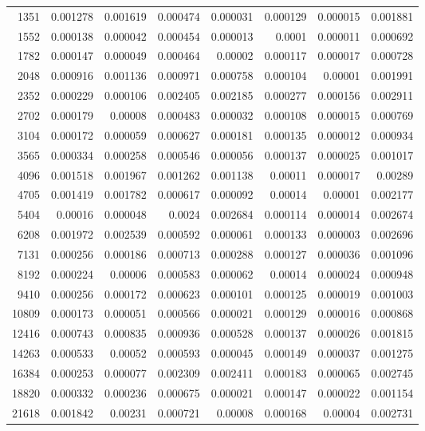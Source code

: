\begin{tabular}{r r r r r r r r}
1351 & 0.001278 & 0.001619 & 0.000474 & 0.000031 & 0.000129 & 0.000015 & 0.001881 \\
1552 & 0.000138 & 0.000042 & 0.000454 & 0.000013 & 0.0001 & 0.000011 & 0.000692 \\
1782 & 0.000147 & 0.000049 & 0.000464 & 0.00002 & 0.000117 & 0.000017 & 0.000728 \\
2048 & 0.000916 & 0.001136 & 0.000971 & 0.000758 & 0.000104 & 0.00001 & 0.001991 \\
2352 & 0.000229 & 0.000106 & 0.002405 & 0.002185 & 0.000277 & 0.000156 & 0.002911 \\
2702 & 0.000179 & 0.00008 & 0.000483 & 0.000032 & 0.000108 & 0.000015 & 0.000769 \\
3104 & 0.000172 & 0.000059 & 0.000627 & 0.000181 & 0.000135 & 0.000012 & 0.000934 \\
3565 & 0.000334 & 0.000258 & 0.000546 & 0.000056 & 0.000137 & 0.000025 & 0.001017 \\
4096 & 0.001518 & 0.001967 & 0.001262 & 0.001138 & 0.00011 & 0.000017 & 0.00289 \\
4705 & 0.001419 & 0.001782 & 0.000617 & 0.000092 & 0.00014 & 0.00001 & 0.002177 \\
5404 & 0.00016 & 0.000048 & 0.0024 & 0.002684 & 0.000114 & 0.000014 & 0.002674 \\
6208 & 0.001972 & 0.002539 & 0.000592 & 0.000061 & 0.000133 & 0.000003 & 0.002696 \\
7131 & 0.000256 & 0.000186 & 0.000713 & 0.000288 & 0.000127 & 0.000036 & 0.001096 \\
8192 & 0.000224 & 0.00006 & 0.000583 & 0.000062 & 0.00014 & 0.000024 & 0.000948 \\
9410 & 0.000256 & 0.000172 & 0.000623 & 0.000101 & 0.000125 & 0.000019 & 0.001003 \\
10809 & 0.000173 & 0.000051 & 0.000566 & 0.000021 & 0.000129 & 0.000016 & 0.000868 \\
12416 & 0.000743 & 0.000835 & 0.000936 & 0.000528 & 0.000137 & 0.000026 & 0.001815 \\
14263 & 0.000533 & 0.00052 & 0.000593 & 0.000045 & 0.000149 & 0.000037 & 0.001275 \\
16384 & 0.000253 & 0.000077 & 0.002309 & 0.002411 & 0.000183 & 0.000065 & 0.002745 \\
18820 & 0.000332 & 0.000236 & 0.000675 & 0.000021 & 0.000147 & 0.000022 & 0.001154 \\
21618 & 0.001842 & 0.00231 & 0.000721 & 0.00008 & 0.000168 & 0.00004 & 0.002731 \\

\end{tabular}
